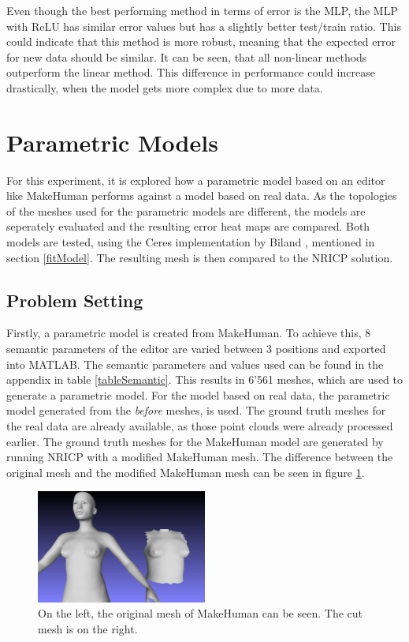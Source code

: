Even though the best performing method in terms of error is the MLP, the MLP with ReLU has similar error values but has a slightly better test/train ratio. This could indicate that this method is more robust, meaning that the expected error for new data should be similar. It can be seen, that all non-linear methods outperform the linear method. This difference in performance could increase drastically, when the model gets more complex due to more data.

\newpage

\section{Parametric Models}
For this experiment, it is explored how a parametric model based on an editor like MakeHuman performs against a model based on real data. As the topologies of the meshes used for the parametric models are different, the models are seperately evaluated and the resulting error heat maps are compared. Both models are tested, using the Ceres implementation by Biland \cite{Biland17}, mentioned in section \ref{fitModel}. The resulting mesh is then compared to the NRICP solution.

\subsection{Problem Setting}
Firstly, a parametric model is created from MakeHuman. To achieve this, 8 semantic parameters of the editor are varied between 3 positions and exported into MATLAB. The semantic parameters and values used can be found in the appendix in table \ref{tableSemantic}.
This results in 6'561 meshes, which are used to generate a parametric model. For the model based on real data, the parametric model generated from the \textit{before} meshes, is used. The ground truth meshes for the real data are already available, as those point clouds were already processed earlier. The ground truth meshes for the MakeHuman model are generated by running NRICP with a modified MakeHuman mesh. The difference between the original mesh and the modified MakeHuman mesh can be seen in figure \ref{fig:mhcut}.

\begin{figure}[h]
\centering
\includegraphics[width=0.5\textwidth]{figures/meshcut00}
\caption[Cut MakeHuman mesh]{On the left, the original mesh of MakeHuman can be seen. The cut mesh is on the right.}
\label{fig:mhcut}
\end{figure}


